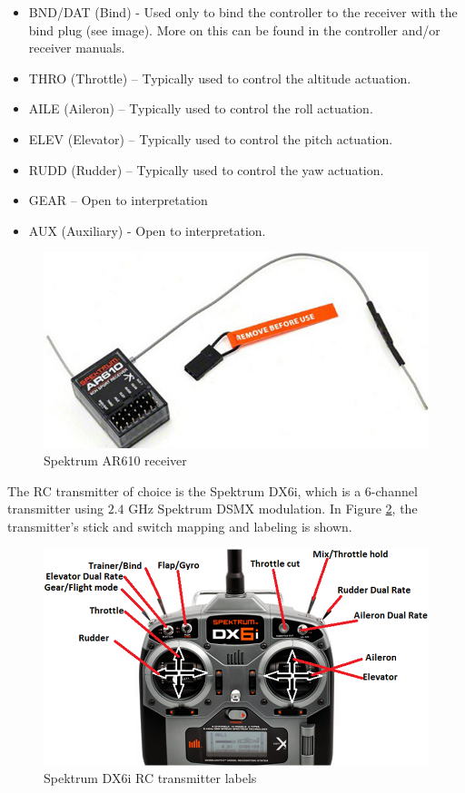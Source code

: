 \documentclass[a4paper]{report}
\begin{document}
\begin{itemize}
  \item BND/DAT (Bind) - Used only to bind the controller to the receiver with the bind plug (see image). More on this can be found in the controller and/or receiver manuals.
  \item THRO (Throttle) – Typically used to control the altitude actuation.
  \item AILE (Aileron) – Typically used to control the roll actuation. 
  \item ELEV (Elevator) – Typically used to control the pitch actuation.
  \item RUDD (Rudder) – Typically used to control the yaw actuation.
  \item GEAR – Open to interpretation
  \item AUX (Auxiliary) - Open to interpretation.
\end{itemize}

\begin{figure}[h]
    \centering
    \includegraphics[scale=0.8]{images/ar610.png}
    \caption{Spektrum AR610 receiver}
    \label{fig:ar610}
\end{figure}
 
The RC transmitter of choice is the Spektrum DX6i, which is a 6-channel transmitter using $2.4$ GHz Spektrum DSMX modulation. In Figure \ref{fig:dx6i_map}, the transmitter's stick and switch mapping and labeling is shown.

\begin{figure}[h]
    \centering
    \includegraphics[scale=0.6]{images/dx6i_map.png}
    \caption{Spektrum DX6i RC transmitter labels}
    \label{fig:dx6i_map}
\end{figure}
\end{document}
